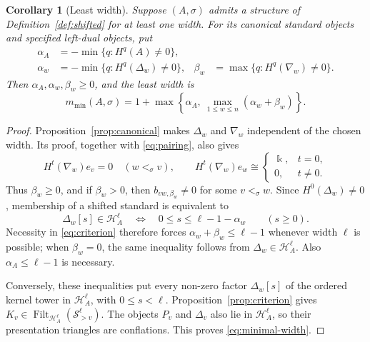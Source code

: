 \documentclass[11pt,a4paper]{article}
\renewcommand{\H}{\mathcal H}
\newcommand{\std}{\Delta}
\newcommand{\costd}{\nabla}
\DeclareMathOperator{\Filt}{Filt}
\theoremstyle{plain}
\newtheorem{corollary}[theorem]{Corollary}
\theoremstyle{definition}
\numberwithin{equation}{section}
\begin{document}
\begin{corollary}[Least width]\label{cor:width}
Suppose $(A,\sigma)$ admits a structure of
Definition~\ref{def:shifted} for at least one width. For its canonical
standard objects and specified left-dual objects, put
\begin{equation}\label{eq:depths}
 \begin{aligned}
 \alpha_A&=-\min\{q:H^q(A)\neq0\},\\
 \alpha_w&=-\min\{q:H^q(\std_w)\neq0\},&
 \beta_w&=\max\{q:H^q(\costd_w)\neq0\}.
 \end{aligned}
\end{equation}
Then $\alpha_A,\alpha_w,\beta_w\geq0$, and the least width is
\begin{equation}\label{eq:minimal-width}
 m_{\min}(A,\sigma)
 =1+\max\left\{\alpha_A,\ \max_{1\leq w\leq n}
                         (\alpha_w+\beta_w)\right\}.
\end{equation}
\end{corollary}
\begin{proof}
Proposition~\ref{prop:canonical} makes $\std_w$ and $\costd_w$
independent of the chosen width. Its proof, together with
\eqref{eq:pairing}, also gives
\begin{equation}\label{eq:dual-support}
 H^t(\costd_w)e_v=0\quad(w<_\sigma v),\qquad
 H^t(\costd_w)e_w\cong
 \begin{cases}\Bbbk,&t=0,\\0,&t\neq0.\end{cases}
\end{equation}
Thus $\beta_w\geq0$, and if $\beta_w>0$, then
$b_{vw,\beta_w}\neq0$ for some $v<_\sigma w$.
Since $H^0(\std_w)\neq0$, membership of a shifted standard is
equivalent to
\[
 \std_w[s]\in\H_A^\ell
 \quad\Longleftrightarrow\quad
 0\leq s\leq\ell-1-\alpha_w
 \qquad(s\geq0).
\]
Necessity in \eqref{eq:criterion} therefore forces
$\alpha_w+\beta_w\leq\ell-1$ whenever width $\ell$ is possible;
when $\beta_w=0$, the same inequality follows from
$\std_w\in\H_A^\ell$. Also $\alpha_A\leq\ell-1$ is necessary.

Conversely, these inequalities put every non-zero factor
$\std_w[s]$ of the ordered kernel tower in $\H_A^\ell$, with
$0\leq s<\ell$. Proposition~\ref{prop:criterion} gives
$K_v\in\Filt_{\H_A^\ell}(\mathcal S_{>v}^\ell)$.
The objects $P_v$ and $\std_v$ also lie in $\H_A^\ell$, so their
presentation triangles are conflations. This proves
\eqref{eq:minimal-width}.
\end{proof}
\end{document}
